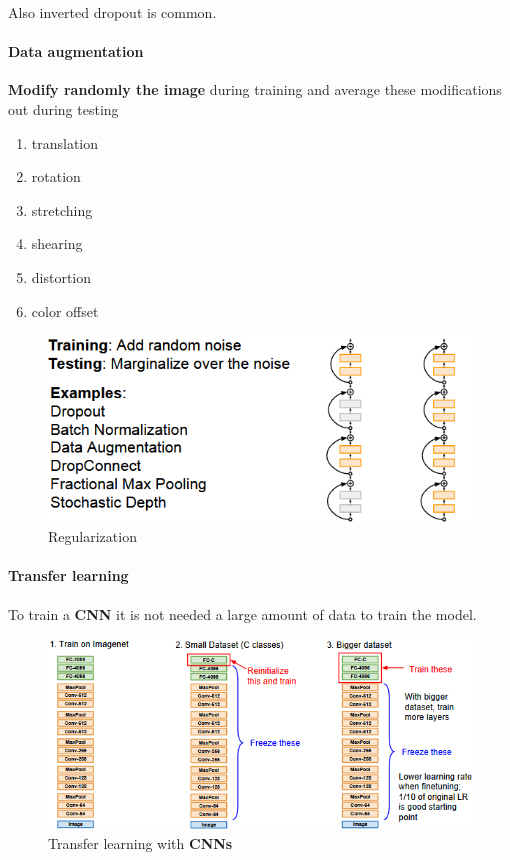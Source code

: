 \documentclass[11pt]{article}
\begin{document}
Also inverted dropout is common.
\paragraph{Data augmentation}
\textbf{Modify randomly the image} during training and average these modifications out during testing
\begin{multicols}{3}
\begin{enumerate}
    \item translation
    \item rotation
    \item stretching
    \item shearing
    \item distortion
    \item color offset
\end{enumerate}{}

\end{multicols}{}
\begin{figure}[h]
\centering
\captionsetup{justification=centering}
\includegraphics[width=0.7\linewidth]{L625.pdf}
\caption{ Regularization}
\label{fig:L625}
\end{figure}
\clearpage
\paragraph{Transfer learning}
To train a \textbf{CNN} it is not needed a large amount of data to train the model.
\begin{figure}[h]
\centering
\captionsetup{justification=centering}
\includegraphics[width=0.7\linewidth]{L626.pdf}
\caption{ Transfer learning with \textbf{CNNs}}
\label{fig:L626}
\end{figure}
\end{document}
